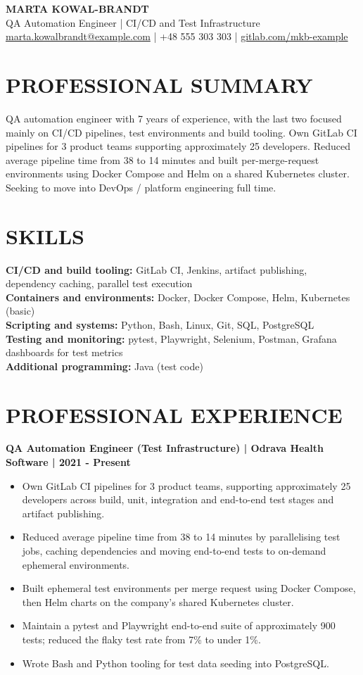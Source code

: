 \documentclass[11pt,a4paper]{article}
\newcommand{\cvsection}[1]{\section*{#1}}
\begin{document}
\begin{center}
{\LARGE\bfseries\color{primarycolor} MARTA KOWAL-BRANDT}\\[0.3em]
{\large\color{accentcolor} QA Automation Engineer | CI/CD and Test Infrastructure}\\[0.3em]
{\small \href{mailto:marta.kowalbrandt@example.com}{marta.kowalbrandt@example.com} | +48 555 303 303 | \href{https://gitlab.com/mkb-example}{gitlab.com/mkb-example}}
\end{center}
\cvsection{PROFESSIONAL SUMMARY}
QA automation engineer with 7 years of experience, with the last two focused mainly on CI/CD pipelines, test environments and build tooling. Own GitLab CI pipelines for 3 product teams supporting approximately 25 developers. Reduced average pipeline time from 38 to 14 minutes and built per-merge-request environments using Docker Compose and Helm on a shared Kubernetes cluster. Seeking to move into DevOps / platform engineering full time.
\cvsection{SKILLS}
\textbf{CI/CD and build tooling:} GitLab CI, Jenkins, artifact publishing, dependency caching, parallel test execution\\
\textbf{Containers and environments:} Docker, Docker Compose, Helm, Kubernetes (basic)\\
\textbf{Scripting and systems:} Python, Bash, Linux, Git, SQL, PostgreSQL\\
\textbf{Testing and monitoring:} pytest, Playwright, Selenium, Postman, Grafana dashboards for test metrics\\
\textbf{Additional programming:} Java (test code)
\cvsection{PROFESSIONAL EXPERIENCE}
\textbf{QA Automation Engineer (Test Infrastructure) | Odrava Health Software | 2021 - Present}
\begin{itemize}
\item Own GitLab CI pipelines for 3 product teams, supporting approximately 25 developers across build, unit, integration and end-to-end test stages and artifact publishing.
\item Reduced average pipeline time from 38 to 14 minutes by parallelising test jobs, caching dependencies and moving end-to-end tests to on-demand ephemeral environments.
\item Built ephemeral test environments per merge request using Docker Compose, then Helm charts on the company's shared Kubernetes cluster.
\item Maintain a pytest and Playwright end-to-end suite of approximately 900 tests; reduced the flaky test rate from 7\% to under 1\%.
\item Wrote Bash and Python tooling for test data seeding into PostgreSQL.
\end{itemize}
\end{document}
